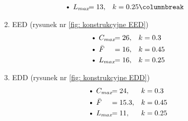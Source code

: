 \begin{multicols*}{2}
\begin{enumerate}
\begin{align*}
                \hspace*{-0.7cm}\text{\textbullet}\ &L_{max} &\hspace*{-0.5cm}&= 13, & &k = 0.25
                \columnbreak
            \end{align*}
        \item EED (rysunek nr \ref{fig: konstrukcyjne EED})
            \begin{align*}
                \hspace*{-0.7cm}\text{\textbullet}\ &C_{max} &\hspace*{-0.5cm}&= 26, & &k =  0.3 \\
                \hspace*{-0.7cm}\text{\textbullet}\ &\bar{F} &\hspace*{-0.5cm}&= 16, & &k =  0.45 \\
                \hspace*{-0.7cm}\text{\textbullet}\ &L_{max} &\hspace*{-0.5cm}&= 16, & &k = 0.25
            \end{align*}
        \vspace*{-1.0cm}
        \item EDD (rysunek nr \ref{fig: konstrukcyjne EDD})
        \vspace*{-0.1cm}
            \begin{align*}
                \hspace*{-0.7cm}\text{\textbullet}\ &C_{max} &\hspace*{-0.5cm}&= 24, & &k =  0.3 \\
                \hspace*{-0.7cm}\text{\textbullet}\ &\bar{F} &\hspace*{-0.5cm}&= 15.3, & &k =  0.45 \\
                \hspace*{-0.7cm}\text{\textbullet}\ &L_{max} &\hspace*{-0.5cm}&= 11, & &k = 0.25
            \end{align*}
    \end{enumerate}
\end{multicols*}